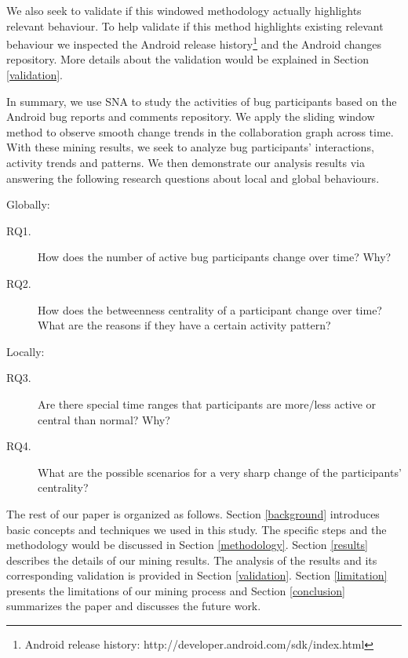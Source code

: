\documentclass[10pt, conference, compsocconf]{IEEEtran}
\begin{document}
We also seek to validate if this windowed methodology actually
highlights relevant behaviour.
To help validate if this method highlights existing relevant behaviour 
we inspected the Android release
history\footnote[1]{Android release history:
  http://developer.android.com/sdk/index.html} and the Android changes
repository.
More details about the validation would be explained in Section
\ref{validation}.
 

In summary, we use SNA to study the activities of bug
participants based on the Android bug reports and comments
repository. 
We apply the sliding window method to observe smooth change trends
in the collaboration graph across time.
With these mining results, we seek to analyze bug participants'
interactions, activity trends and patterns. 
We then demonstrate our analysis results via answering the following
research questions about local and global behaviours.


Globally:

\begin{description}
\item[RQ1.] How does the number of active bug participants change over
  time? Why?
\item[RQ2.] How does the betweenness centrality of a participant change over
time? What are the reasons if they have a certain activity pattern?
\end{description}

Locally:
\begin{description}

\item[RQ3.] Are there special time ranges that participants are more/less
active or central than normal? Why?


\item[RQ4.] What are the possible scenarios for a very sharp change of the
participants' centrality?
\end{description}

% 
The rest of our paper is organized as follows. 
Section \ref{background} introduces basic concepts and techniques we
used in this study. 
The specific steps and the methodology would be discussed in Section
\ref{methodology}. 
Section \ref{results} describes the details of our mining results. 
The analysis of the results and its corresponding validation is
provided in Section \ref{validation}. 
Section \ref{limitation} presents the limitations of our mining
process and Section \ref{conclusion} summarizes the paper and
discusses the future work.
\end{document}
